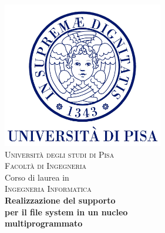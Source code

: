 



\begin{titlepage}
 \begin{center}
     \includegraphics[width=7cm]{Immagini/unipi.jpg}\\
     \vspace{1em}
     {\Large \textsc{Università degli studi di Pisa}}\\
     \vspace{1em}
     {\Large \textsc{Facoltà di Ingegneria}}\\
     \vspace{2em}
     {\normalsize Corso di laurea in}\\
     \vspace{1em}
     {\Large \textsc{Ingegneria Informatica}}\\
     \vspace{2em}
     {\LARGE \textbf{Realizzazione del supporto }}\\
     \vspace{1em}
     {\LARGE \textbf {per il file system in un nucleo}}\\
     \vspace{1em}
     {\LARGE \textbf {multiprogrammato}}\\
     \vspace{1em}
 \end{center}



\end{titlepage}
